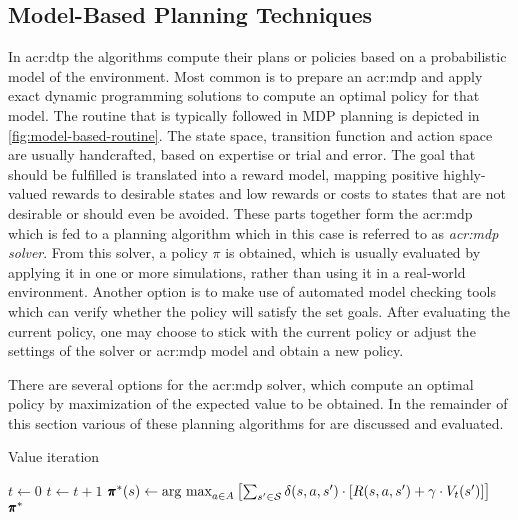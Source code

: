 \subsection{Model-Based Planning Techniques}	%
\label{subsec:model-based-planning}

In \acrshort{acr:dtp} the algorithms compute their plans or policies based on a probabilistic model of the environment.
Most common is to prepare an \acrshort{acr:mdp} and apply exact dynamic programming solutions to compute an optimal policy for that model.
The routine that is typically followed in MDP planning is depicted in \autoref{fig:model-based-routine}.
The state space, transition function and action space are usually handcrafted, based on expertise or trial and error.
The goal that should be fulfilled is translated into a reward model, mapping positive highly-valued rewards to desirable states and low rewards or costs to states that are not desirable or should even be avoided.
These parts together form the \acrshort{acr:mdp} which is fed to a planning algorithm which in this case is referred to as \textit{\acrshort{acr:mdp} solver}.
From this solver, a policy $\pi$ is obtained, which is usually evaluated by applying it in one or more simulations, rather than using it in a real-world environment.
Another option is to make use of automated model checking tools which can verify whether the policy will satisfy the set goals. %
After evaluating the current policy, one may choose to stick with the current policy or adjust the settings of the solver or \acrshort{acr:mdp} model and obtain a new policy.

There are several options for the \acrshort{acr:mdp} solver, which compute an optimal policy by maximization of the expected value to be obtained.
In the remainder of this section various of these planning algorithms for  are discussed and evaluated.

\begin{algorithm}[]
	\caption{Value iteration}
	\label{alg:vi}
	\begin{algorithmic}[1]
		\State $t \gets 0$
		\Repeat
		\State $t \gets t + 1$
		\EndFor
		\State $\pmb{\pi}^*(s) \gets \text{arg max}_{a \in A} \left[\sum_{s' \in \mathcal{S}} \delta(s, a, s') \cdot \left[R(s, a, s') + \gamma \cdot V_{t}(s')\right]\right]$
		\EndFor
		\State\Return $\pmb{\pi}^*$
	\end{algorithmic}
\end{algorithm}

